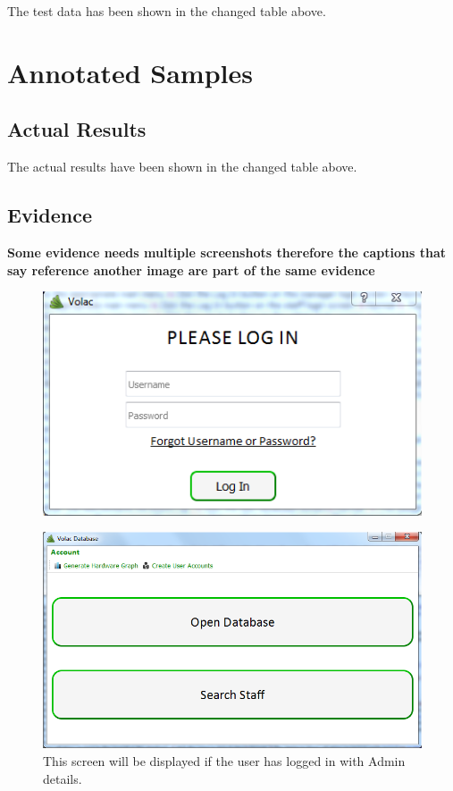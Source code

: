 \begin{landscape}
The test data has been shown in the changed table above.

\section{Annotated Samples}

\subsection{Actual Results}

The actual results have been shown in the changed table above.

\end{landscape}

\subsection{Evidence}

\textbf{Some evidence needs multiple screenshots therefore the captions that say reference another image are part of the same evidence}
\

\begin{figure}[H]
    \includegraphics[width=\textwidth]{./Testing/Images/LoginScreen.png}
    \label{fig:LoginScreen}
\end{figure}

\begin{figure}[H]
    \includegraphics[width=\textwidth]{./Testing/Images/AdminInterface.png}
    \caption{This screen will be displayed if the user has logged in with Admin details.} \label{fig:AdminInterfaceLogin}
\end{figure}

